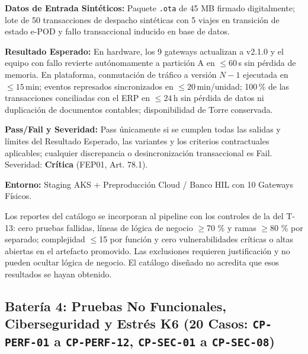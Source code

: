 \par\noindent \textbf{Datos de Entrada Sintéticos:} Paquete \texttt{.ota} de 45 MB firmado digitalmente; lote de 50 transacciones de despacho sintéticas con 5 viajes en transición de estado e-POD y fallo transaccional inducido en base de datos.\par
\par\noindent \textbf{Resultado Esperado:} En hardware, los 9 gateways actualizan a v2.1.0 y el equipo con fallo revierte autónomamente a partición A en $\le 60$\,s sin pérdida de memoria. En plataforma, conmutación de tráfico a versión $N-1$ ejecutada en $\le 15$\,min; eventos represados sincronizados en $\le 20$\,min/unidad; 100\,\% de las transacciones conciliadas con el ERP en $\le 24$\,h sin pérdida de datos ni duplicación de documentos contables; disponibilidad de Torre conservada.\par
\par\noindent \textbf{Pass/Fail y Severidad:} Pass únicamente si se cumplen todas las salidas y límites del Resultado Esperado, las variantes y los criterios contractuales aplicables; cualquier discrepancia o desincronización transaccional es Fail. Severidad: \textbf{Crítica} (FEP01, Art. 78.1).\par
\par\noindent \textbf{Entorno:} Staging AKS + Preproducción Cloud / Banco HIL con 10 Gateways Físicos.\par


Los reportes del catálogo se incorporan al pipeline con los controles de la  del T-13: cero pruebas fallidas, líneas de lógica de negocio \(\ge\)70 \% y ramas \(\ge\)80 \% por separado; complejidad \(\le\)15 por función y cero vulnerabilidades críticas o altas abiertas en el artefacto promovido. Las exclusiones requieren justificación y no pueden ocultar lógica de negocio. El catálogo diseñado no acredita que esos resultados se hayan obtenido.

\subsection*{Batería 4: Pruebas No Funcionales, Ciberseguridad y Estrés K6 (20 Casos: \texttt{C\allowbreak{}P\allowbreak{}-\allowbreak{}P\allowbreak{}E\allowbreak{}R\allowbreak{}F\allowbreak{}-\allowbreak{}0\allowbreak{}1\allowbreak{}} a \texttt{C\allowbreak{}P\allowbreak{}-\allowbreak{}P\allowbreak{}E\allowbreak{}R\allowbreak{}F\allowbreak{}-\allowbreak{}1\allowbreak{}2\allowbreak{}}, \texttt{C\allowbreak{}P\allowbreak{}-\allowbreak{}S\allowbreak{}E\allowbreak{}C\allowbreak{}-\allowbreak{}0\allowbreak{}1\allowbreak{}} a \texttt{C\allowbreak{}P\allowbreak{}-\allowbreak{}S\allowbreak{}E\allowbreak{}C\allowbreak{}-\allowbreak{}0\allowbreak{}8\allowbreak{}})}

